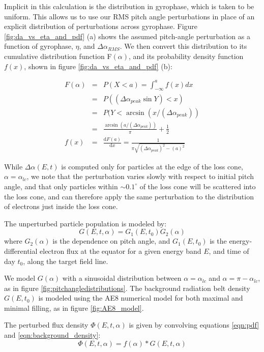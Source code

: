 Implicit in this calculation is the distribution in gyrophase, which is taken to be uniform. This allows us to use our RMS pitch angle perturbations in place of an explicit distribution of perturbations across gyrophase. Figure \ref{fig:da_vs_eta_and_pdf} (a) shows the assumed pitch-angle perturbation as a function of gyrophase, $\eta$, and $\Delta \alpha_{RMS}$. We then convert this distribution to its cumulative distribution function F$(\alpha)$, and its probability density function $f(x)$, shown in figure \ref{fig:da_vs_eta_and_pdf} (b):

\begin{eqnarray}
F(\alpha) & = & P(X < a) = \int_{-\infty}^a f(x) dx \nonumber \\
& = & P((\Delta \alpha_{peak}\sin Y) < x) \nonumber \\
& = & P(Y < \arcsin(x/(\Delta\alpha_{peak})) \nonumber \\  
& = & \frac{\arcsin(a/(\Delta\alpha_{peak}))}{\pi} + \frac{1}{2}  \\
 f(x) & = & \frac{\mathrm{d}F(a)}{\mathrm{d}x} = \frac{1}{\pi\sqrt{(\Delta \alpha_{peak})^2 - (a)^2}}
 \label{eqn:pdf}
\end{eqnarray}

While $\Delta \alpha(E,t)$ is computed only for particles at the edge of the loss cone, $\alpha = \alpha_{lc}$, we note that the perturbation varies slowly with respect to initial pitch angle, and that only particles within $\sim 0.1^\circ$ of the loss cone will be scattered into the loss cone, and can therefore apply the same perturbation to the distribution of electrons just inside the loss cone.

The unperturbed particle population is modeled by:
\begin{equation}
G(E,t,\alpha) = G_1(E, t_0)G_2(\alpha)
\label{eqn:background_density}
\end{equation}
where $G_2(\alpha)$ is the dependence on pitch angle, and $G_1(E, t_0)$ is the energy-differential electron flux at the equator for a given energy band $E$, and time of day $t_0$, along the target field line.

We model $G(\alpha)$ with a sinusoidal distribution between $\alpha=\alpha_{lc}$ and $\alpha = \pi - \alpha_{lc}$, as in figure \ref{fig:pitchangledistributions}. The background radiation belt density $G(E,t_0)$ is modeled using the AE8 numerical model for both maximal and minimal filling, as in figure \ref{fig:AE8_model}.

The perturbed flux density $\Phi(E,t,\alpha)$ is given by convolving equations \eqref{eqn:pdf} and \eqref{eqn:background_density}:
\begin{equation}
\Phi(E,t,\alpha) = f(\alpha)*G(E,t,\alpha)
\label{eqn:convolution}
\end{equation}

